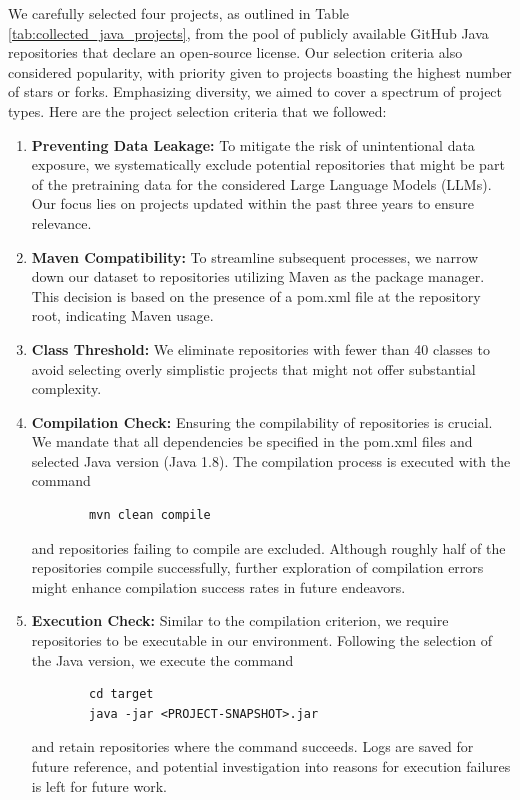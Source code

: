 We carefully selected four projects, as outlined in Table \ref{tab:collected_java_projects}, from the pool of publicly available GitHub Java repositories that declare an open-source license. Our selection criteria also considered popularity, with priority given to projects boasting the highest number of stars or forks. Emphasizing diversity, we aimed to cover a spectrum of project types. Here are the project selection criteria that we followed:\\
    \begin{enumerate}
        \item \textbf{Preventing Data Leakage:} To mitigate the risk of unintentional data exposure, we systematically exclude potential repositories that might be part of the pretraining data for the considered Large Language Models (LLMs). Our focus lies on projects updated within the past three years to ensure relevance.
        
        \item \textbf{Maven Compatibility:} To streamline subsequent processes, we narrow down our dataset to repositories utilizing Maven as the package manager. This decision is based on the presence of a pom.xml file at the repository root, indicating Maven usage.

        \item \textbf{Class Threshold:} We eliminate repositories with fewer than 40 classes to avoid selecting overly simplistic projects that might not offer substantial complexity.
        
        \item \textbf{Compilation Check:} Ensuring the compilability of repositories is crucial. We mandate that all dependencies be specified in the pom.xml files and selected Java version (Java 1.8). The compilation process is executed with the command 
        \begin{verbatim}
        mvn clean compile
        \end{verbatim} and repositories failing to compile are excluded. Although roughly half of the repositories compile successfully, further exploration of compilation errors might enhance compilation success rates in future endeavors.
        
        \item \textbf{Execution Check:} Similar to the compilation criterion, we require repositories to be executable in our environment. Following the selection of the Java version, we execute the command 
        \begin{verbatim}
        cd target
        java -jar <PROJECT-SNAPSHOT>.jar
        \end{verbatim}
        and retain repositories where the command succeeds. Logs are saved for future reference, and potential investigation into reasons for execution failures is left for future work.
    \end{enumerate}
